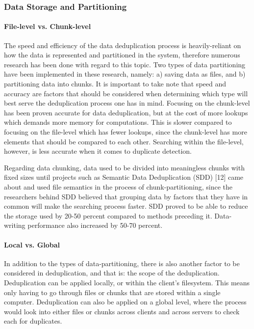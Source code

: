 \documentclass[journal]{IEEEtran}
\begin{document}
\subsubsection{Data Storage and Partitioning}

\paragraph{File-level vs. Chunk-level}

The speed and efficiency of the data deduplication process is heavily-reliant on how the data is represented and partitioned in the system, therefore numerous research has been done with regard to this topic. Two types of data partitioning have been implemented in these research, namely: a) saving data as files, and b) partitioning data into chunks. It is important to take note that speed and accuracy are factors that should be considered when determining which type will best serve the deduplication process one has in mind. Focusing on the chunk-level has been proven accurate for data deduplication, but at the cost of more lookups which demands more memory for computations. This is slower compared to focusing on the file-level which has fewer lookups, since the chunk-level has more elements that should be compared to each other. Searching within the file-level, however, is less accurate when it comes to duplicate detection.

Regarding data chunking, data used to be divided into meaningless chunks with fixed sizes until projects such as Semantic Data Deduplication (SDD) [12] came about and used file semantics in the process of chunk-partitioning, since the researchers behind SDD believed that grouping data by factors that they have in common will make the searching process faster. SDD proved to be able to reduce the storage used by 20-50 percent compared to methods preceding it. Data-writing performance also increased by 50-70 percent.

\paragraph{Local vs. Global}

In addition to the types of data-partitioning, there is also another factor to be considered in deduplication, and that is: the scope of the deduplication. Deduplication can be applied locally, or within the client’s filesystem. This means only having to go through files or chunks that are stored within a single computer. Deduplication can also be applied on a global level, where the process would look into either files or chunks across clients and across servers to check each for duplicates. 
\end{document}
